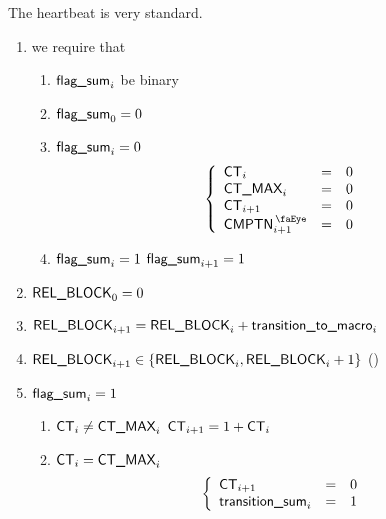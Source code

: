 The heartbeat is very standard.
\begin{enumerate}
	\item we require that
		\begin{enumerate}
		        \item $\textsf{flag\_sum} _{i}$ be binary
		        \item $\textsf{flag\_sum} _{0} = 0$
		        \item \If $\textsf{flag\_sum} _{i} = 0$ \Then
				\[
					\left\{ \begin{array}{lcl}
						\ct            _{i}      & = & 0 \\
						\maxCt         _{i}      & = & 0 \\
						\ct            _{i  + 1} & = & 0 \\
						\isComputation _{i  + 1} & = & 0 \\
					\end{array} \right.
				\]
		        \item \If $\textsf{flag\_sum} _{i} = 1$ \Then $\textsf{flag\_sum} _{i + 1} = 1$
		\end{enumerate}
	\item $\textsf{REL\_BLOCK} _{0} = 0$
	\item $\textsf{REL\_BLOCK} _{i + 1} = \textsf{REL\_BLOCK} _{i} + \textsf{transition\_to\_macro} _{i}$ 
	\item $\textsf{REL\_BLOCK} _{i + 1} \in \{ \textsf{REL\_BLOCK} _{i}, \textsf{REL\_BLOCK} _{i} + 1 \}$ (\sanityCheck)
	\item \If $\textsf{flag\_sum} _{i} = 1$ \Then
		\begin{enumerate}
			\item \If $\textsf{CT} _{i} \neq \textsf{CT\_MAX} _{i}$ \Then $\textsf{CT} _{i + 1} = 1 + \textsf{CT} _{i}$
			\item \If $\textsf{CT} _{i} =    \textsf{CT\_MAX} _{i}$ \Then
				\[
					\left\{ \begin{array}{lcl}
						\textsf{CT}               _{i  + 1} & = & 0 \\
						\textsf{transition\_sum} _{i}      & = & 1 \\
					\end{array} \right.
				\]
		\end{enumerate}
\end{enumerate}
